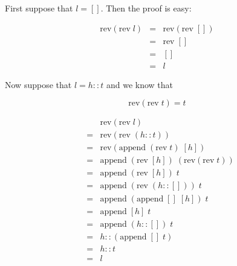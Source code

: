\begin{slide*}


\vspace*{0.5cm}

First suppose that {\red $l = []$}. Then the proof is easy:

{\red
\begin{eqnarray*}
\mbox{rev}(\mbox{rev}\; l)
& = & \mbox{rev}(\mbox{rev}\; [])                               \\
& = & \mbox{rev}\; []                                               \\
& = & []                                                                \\
& = & l
\end{eqnarray*}
}

Now suppose that {\red $l = h::t$} and we know that

{\red $$ \mbox{rev}(\mbox{rev}\; t) = t $$}

\end{slide*}

\begin{slide*}


\vspace*{0.5cm}

{\red
\begin{eqnarray*}
& & \mbox{rev}(\mbox{rev}\; l)                                  \\
& = & \mbox{rev}(\mbox{rev}\; (h::t))                           \\
& = & \mbox{rev}(\mbox{append}\; (\mbox{rev}\; t)\; [h])        \\
& = & \mbox{append}\; (\mbox{rev}\; [h])\; (\mbox{rev} (\mbox{rev}\; t)) \\
& = & \mbox{append}\; (\mbox{rev}\; [h])\; t                        \\
& = & \mbox{append}\; (\mbox{rev}\; (h::[]))\; t                    \\
& = & \mbox{append}\; (\mbox{append}\; []\; [h])\; t                    \\
& = & \mbox{append}\; [h]\; t                                           \\
& = & \mbox{append}\; (h::[])\; t                                       \\
& = & h::(\mbox{append}\; []\; t)                                       \\
& = & h::t                                                              \\
& = & l
\end{eqnarray*}}

\end{slide*}



